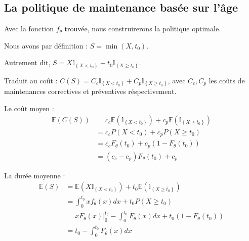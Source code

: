\documentclass[10pt,a4paper]{article}
\begin{document}
\FloatBarrier

\subsection{La politique de maintenance basée sur l'âge}

Avec la fonction $f_\theta$ trouvée, nous construirerons la politique optimale.

Nous avons par définition : $S = \min \left( {X,{t_0}} \right)$.

Autrement dit, $S = X{\mathbb{I}_{\left\{ {X < {t_0}} \right\}}} + {t_0}{\mathbb{I}_{\left\{ {X \geqslant {t_0}} \right\}}}$.

Traduit au coût : $C\left( S \right) = {C_c}{\mathbb{I}_{\left\{ {X < {t_0}} \right\}}} + {C_p}{\mathbb{I}_{\left\{ {X \geqslant {t_0}} \right\}}}$, avec $C_c, C_p$ les coûts de maintenances correctives et préventives réspectivement.

Le coût moyen :
\begin{align}
    \label{coutmoy}
    \mathbb{E}\left( {C\left( S \right)} \right) & = {c_c}\mathbb{E}\left( {{\mathbb{I}_{\left\{ {X < {t_0}} \right\}}}} \right) + {c_p}\mathbb{E}\left( {{\mathbb{I}_{\left\{ {X \geqslant {t_0}} \right\}}}} \right) \nonumber \\
    & = {c_c}P\left( {X < {t_0}} \right) + {c_p}P\left( {X \geqslant {t_0}} \right) \nonumber \\
    & = {c_c}{F_\theta }\left( {{t_0}} \right) + {c_p}\left( {1 - {F_\theta }\left( {{t_0}} \right)} \right) \nonumber \\
    & = \left( {{c_c} - {c_p}} \right){F_\theta }\left( {{t_0}} \right) + {c_p}
\end{align}

La durée moyenne :
\begin{align}
    \label{dureemoy}
    \mathbb{E}\left( S \right) & = \mathbb{E}\left( {X{\mathbb{I}_{\left\{ {X < {t_0}} \right\}}}} \right) + {t_0}\mathbb{E}\left( {{\mathbb{I}_{\left\{ {X \geqslant {t_0}} \right\}}}} \right)\nonumber\\
    & = \int_0^{{t_0}} {x{f_\theta }\left( x \right)dx}  + {t_0}P\left( {X \geqslant {t_0}} \right) \nonumber \\
    & = x{F_\theta }\left( x \right)|_0^{{t_0}} - \int_0^{{t_0}} {{F_\theta }\left( x \right)dx}  + {t_0}\left( {1 - {F_\theta }\left( {{t_0}} \right)} \right) \nonumber \\
    & = {t_0} - \int_0^{{t_0}} {{F_\theta }\left( x \right)dx}
\end{align}
\end{document}
